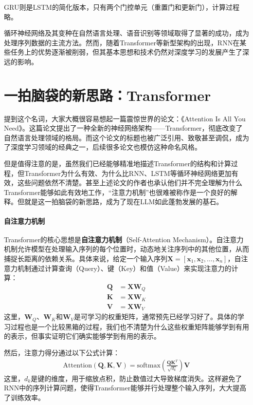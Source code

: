 GRU则是LSTM的简化版本，只有两个门控单元（重置门和更新门），计算过程略。

循环神经网络及其变种在自然语言处理、语音识别等领域取得了显著的成功，成为处理序列数据的主流方法。然而，随着Transformer等新型架构的出现，RNN在某些任务上的优势逐渐被削弱，但其基本思想和技术仍然对深度学习的发展产生了深远的影响。

\section{一拍脑袋的新思路：Transformer}

提到这个名词，大家大概很容易想起一篇震惊世界的论文：《Attention Is All You Need》。这篇论文提出了一种全新的神经网络架构——Transformer，彻底改变了自然语言处理领域的格局。而这个论文的标题也被广泛引用、致敬甚至调侃，成为了深度学习领域的经典之一，后续很多论文也模仿这种命名风格。

但是值得注意的是，虽然我们已经能够精准地描述Transformer的结构和计算过程，但Transformer为什么有效、为什么比RNN、LSTM等循环神经网络更加有效，这些问题依然不清楚。甚至上述论文的作者也承认他们并不完全理解为什么Transformer能够如此有效地工作，“注意力机制”也很难被称作是一个良好的解释。但就是这一拍脑袋的新思路，成为了现在LLM如此蓬勃发展的基石。

\paragraph{自注意力机制}

Transformer的核心思想是\textbf{自注意力机制}（Self-Attention Mechanism）。自注意力机制允许模型在处理输入序列的每个位置时，动态地关注序列中的其他位置，从而捕捉长距离的依赖关系。具体来说，给定一个输入序列$\mathbf{X} = [\mathbf{x}_1, \mathbf{x}_2, \ldots, \mathbf{x}_n]$，自注意力机制通过计算查询（Query）、键（Key）和值（Value）来实现注意力的计算：
\begin{align*}
\mathbf{Q} &= \mathbf{X} \mathbf{W}_Q \\
\mathbf{K} &= \mathbf{X} \mathbf{W}_K \\
\mathbf{V} &= \mathbf{X} \mathbf{W}_V
\end{align*}
这里，$\mathbf{W}_Q$、$\mathbf{W}_K$和$\mathbf{W}_V$是可学习的权重矩阵，通常预先已经学习好了。具体的学习过程也是一个比较黑箱的过程，我们也不清楚为什么这些权重矩阵能够学到有用的表示，但事实证明它们确实能够学到有用的表示。

然后，注意力得分通过以下公式计算：
\begin{align*}
    \text{Attention}(\mathbf{Q}, \mathbf{K}, \mathbf{V}) = \text{softmax}\left(\frac{\mathbf{Q} \mathbf{K}^T}{\sqrt{d_k}}\right) \mathbf{V}
\end{align*}
这里，$d_k$是键的维度，用于缩放点积，防止数值过大导致梯度消失。这样避免了RNN中的序列计算问题，使得Transformer能够并行处理整个输入序列，大大提高了训练效率。

